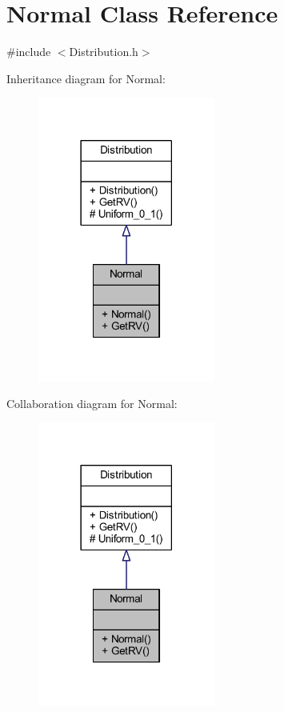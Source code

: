 \hypertarget{class_normal}{}\section{Normal Class Reference}
\label{class_normal}


{\ttfamily \#include $<$Distribution.\+h$>$}



Inheritance diagram for Normal\+:
\nopagebreak
\begin{figure}[H]
\begin{center}
\leavevmode
\includegraphics[width=165pt]{class_normal__inherit__graph}
\end{center}
\end{figure}


Collaboration diagram for Normal\+:
\nopagebreak
\begin{figure}[H]
\begin{center}
\leavevmode
\includegraphics[width=165pt]{class_normal__coll__graph}
\end{center}
\end{figure}
